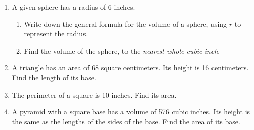 \documentclass[12pt, twoside]{article}
\begin{document}
\begin{enumerate}
\newpage
\item A given sphere has a radius of 6 inches.
\begin{enumerate}
  \item Write down the general formula for the volume of a sphere, using $r$ to represent the radius. \vspace{1cm}
  \item Find the volume of the sphere, to the \emph{nearest whole cubic inch}.
\end{enumerate}  \vspace{3cm}

\item A triangle has an area of 68 square centimeters. Its height is 16 centimeters. Find the length of its base. \vspace{3cm}

\item The perimeter of a square is 10 inches. Find its area. \vspace{4cm}

\item A pyramid with a square base has a volume of 576 cubic inches. Its height is the same as the lengths of the sides of the base. Find the area of its base.
  
\end{enumerate}
\end{document}
